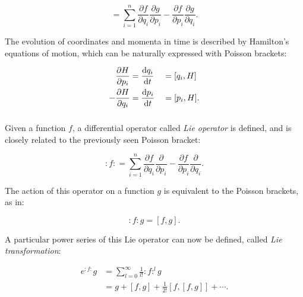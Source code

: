 \begin{equation}
    [f,g] = \sum^n_{i=1} \frac{\partial f}{\partial q_i} \frac{\partial g}{\partial p_i}
                       - \frac{\partial f}{\partial p_i} \frac{\partial g}{\partial q_i}.
    \label{eq:coordinate_systems:poisson_bracket}
\end{equation}


The evolution of coordinates and momenta in time is described by Hamilton's equations of motion, which can
be naturally expressed with Poisson brackets:

\begin{equation}
    \begin{aligned}
        \frac{\partial H}{\partial p_i}   &= \frac{\mathop{}\!\mathrm{d} q_i}{\mathop{}\!\mathrm{d} t}  &&= [q_i, H] \\
       -\frac{\partial H}{\partial q_i}   &= \frac{\mathop{}\!\mathrm{d} p_i}{\mathop{}\!\mathrm{d} t}  &&= [p_i, H].
    \end{aligned}
\end{equation}


\subsubsection{}

Given a function $f$, a differential operator called \textit{Lie operator} is defined, and is closely
related to the previously seen Poisson bracket:

\begin{equation}
:f: = \sum^n_{i=1} \frac{\partial f}{\partial q_i} \frac{\partial}{\partial p_i}
                    - \frac{\partial f}{\partial p_i} \frac{\partial}{\partial q_i}.
\end{equation}

The action of this operator on a function $g$ is equivalent to the Poisson brackets, as in:

\begin{equation}
    :f:g = [f,g].
\end{equation}

A particular power series of this Lie operator can now be defined, called \textit{Lie
transformation}:

\begin{equation}
    \begin{aligned}
        e^{:f:}g &= \sum_{l=0}^\infty \frac{1}{l!} :f:^l g \\
                 &= g + [f,g] + \frac{1}{2!}[f, [f, g]] + \cdots .
    \end{aligned}
    \label{eq:coordinate_systems:expansion_exponential}
\end{equation}



